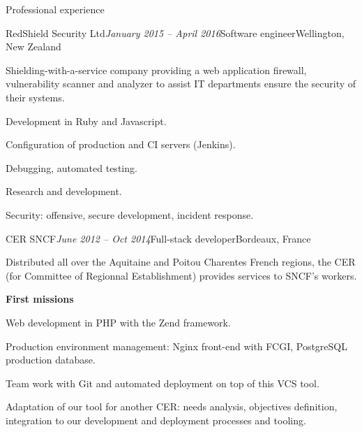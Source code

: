\begin{rSection}{Professional experience}

  \begin{rSubsection}{RedShield Security Ltd}{\em January 2015 -- April 2016}{Software engineer}{Wellington, New Zealand}
    \item[]
      Shielding-with-a-service company providing a web application firewall, vulnerability scanner and analyzer to assist IT departments ensure the security of their systems.

    \item Development in Ruby and Javascript.
    \item Configuration of production and CI servers (Jenkins).
    \item Debugging, automated testing.
    \item Research and development.
    \item Security: offensive, secure development, incident response.
  \end{rSubsection}


  \begin{rSubsection}{CER SNCF}{\em June 2012 -- Oct 2014}{Full-stack developer}{Bordeaux, France}
    \item[] Distributed all over the Aquitaine and Poitou Charentes French regions, the CER (for Committee of Regionnal Establishment) provides services to SNCF's workers.

    \textbf{First missions}
      \item Web development in PHP with the Zend framework.
      \item Production environment management: Nginx front-end with FCGI, PostgreSQL production database.
      \item Team work with Git and automated deployment on top of this VCS tool.
      \item Adaptation of our tool for another CER: needs analysis, objectives definition, integration to our development and deployment processes and tooling.


\end{rSubsection}
\end{rSection}
